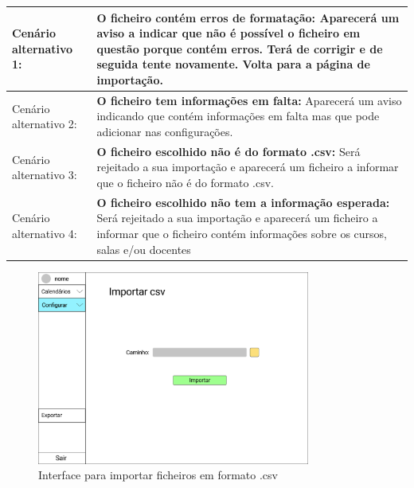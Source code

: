 \documentclass[11pt, twoside]{report}
\begin{document}
\begin{table}[H]
\begin{center}
\begin{tabularx}{\textwidth}{|l|X|}
				\hline
				Cenário alternativo 1:             & \textbf{O ficheiro contém erros de formatação:} Aparecerá um aviso a indicar que não é possível o ficheiro em questão porque contém erros. Terá de corrigir e de seguida tente novamente. Volta para a página de importação. \\
				\hline
				Cenário alternativo 2:             & \textbf{O ficheiro tem informações em falta:} Aparecerá um aviso indicando que contém informações em falta mas que pode adicionar nas configurações.                                                                              \\
				\hline
				Cenário alternativo 3:             & \textbf{O ficheiro escolhido não é do formato .csv:} Será rejeitado a sua importação e aparecerá um ficheiro a informar que o ficheiro não é do formato .csv.                                                                     \\
				\hline
				Cenário alternativo 4:             & \textbf{O ficheiro escolhido não tem a informação esperada:} Será rejeitado a sua importação e aparecerá um ficheiro a informar que o ficheiro contém informações sobre os cursos, salas e/ou docentes                          \\
				\hline
			\end{tabularx}
		\end{center}
	\end{table}
	
	
	
	\begin{figure}[H] 
		\centering 
		\includegraphics[width=0.8\textwidth,height=0.8\textheight,keepaspectratio]{image/prototipowireframes/importar}
		\caption{Interface para importar ficheiros em formato .csv}
	\end{figure}
	
\end{document}
